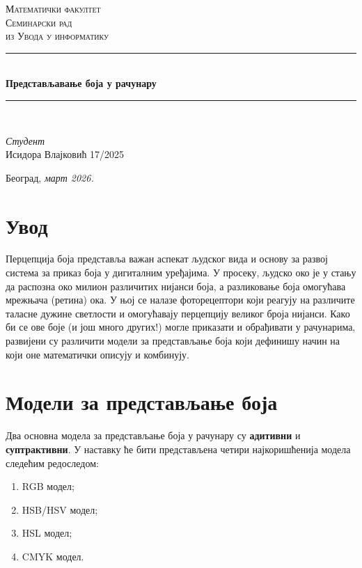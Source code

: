 \documentclass[A4, 11pt]{article}
\begin{document}

    \begin{titlepage}
        \newcommand{\HRule}{\rule{\linewidth}{0.4mm}}
        \centering
        \textsc{\LARGE Математички факултет\\[0.2cm]}
        \vspace{3cm}
        \textsc{\Large Семинарски рад}\\[0.1cm]
        \textsc{\large из Увода у информатику}\\[0.5cm] 
\HRule\\[0.4cm]
{\LARGE\bfseries Представљавање боја у рачунару}\\[0.2cm] 
	
\HRule\\[2cm]
\vspace{1cm}
\vspace{14\baselineskip}
	\begin{minipage}{0.4\textwidth}
		\begin{center}
		    \Large
			\textit{Студент}\\
			Исидора Влајковић 17/2025
		\end{center}
	\end{minipage}
	
	
\vfill\vfill\vfill\vfill 

{\large Београд, \textit{март 2026.}} 
	
\vfill 
	
\end{titlepage}

\large{\tableofcontents}

\section{Увод}
Перцепција боја представља важан аспекат људског вида и основу за развој система за приказ боја у дигиталним уређајима. У просеку, људско око је у стању да распозна око милион различитих нијанси боја, а разликовање боја омогућава мрежњача (ретина) ока. У њој се налазе фоторецептори који реагују на различите таласне дужине светлости и омогућавају перцепцију великог броја нијанси. Како би се ове боје (и још много других!) могле приказати и обрађивати у рачунарима, развијени су различити модели за представљање боја који дефинишу начин на који оне математички описују и комбинују.

\section{Модели за представљање боја}
Два основна модела за представљање боја у рачунару су
\textbf{адитивни} и \textbf{суптрактивни}. У наставку ће бити представљена четири најкоришћенија модела следећим редоследом: 
\begin{enumerate}
    \item RGB модел;
    \item HSB/HSV модел;
    \item HSL модел;
    \item CMYK модел.
\end{enumerate}
\end{document}
